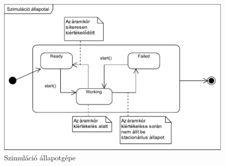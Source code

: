 \begin{figure}[H]
\begin{center}
\includegraphics{chapters/chapter04/seqdiagrams/allapotgep.pdf}
\caption{Szimuláció állapotgépe}
\label{fig:allapotgep}
\end{center}
\end{figure}


